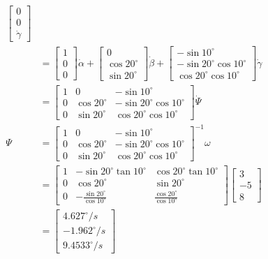 \documentclass[UTF8, 12pt]{ctexart}
\begin{document}
\[\begin{aligned}
        \begin{bmatrix}
            0 \\
            0 \\
            \dot{\gamma}
        \end{bmatrix} \\
    &= \begin{bmatrix}
        1 \\
        0 \\
        0
        \end{bmatrix} \dot{\alpha}
        + \begin{bmatrix}
            0 \\
            \cos20^\circ \\
            \sin20^\circ
        \end{bmatrix} \dot{\beta}
        + \begin{bmatrix}
            -\sin10^\circ \\
            -\sin20^\circ \cos10^\circ \\
            \cos20^\circ \cos10^\circ
        \end{bmatrix} \dot{\gamma} \\
    &= \begin{bmatrix}
        1 & 0 & -\sin10^\circ \\
        0 & \cos20^\circ & -\sin20^\circ \cos10^\circ \\
        0 & \sin20^\circ & \cos20^\circ \cos10^\circ
    \end{bmatrix} \dot{\Psi} \\
    \Psi &= \begin{bmatrix}
            1 & 0 & -\sin10^\circ \\
            0 & \cos20^\circ & -\sin20^\circ \cos10^\circ \\
            0 & \sin20^\circ & \cos20^\circ \cos10^\circ
        \end{bmatrix}^{-1} \omega \\
    &= \begin{bmatrix}
            1 & -\sin20^\circ \tan10^\circ & \cos20^\circ \tan10^\circ \\
            0 & \cos20^\circ & \sin20^\circ \\
            0 & -\frac{\sin20^\circ}{\cos10^\circ} & \frac{\cos20^\circ}{\cos10^\circ}
        \end{bmatrix}
        \begin{bmatrix}
            3 \\
            -5 \\
            8
        \end{bmatrix} \\
    &= \begin{bmatrix}
        4.627^\circ /s \\
        -1.962^\circ /s \\
        9.4533^\circ /s
        \end{bmatrix} \\
\end{aligned}
\]
\end{document}

